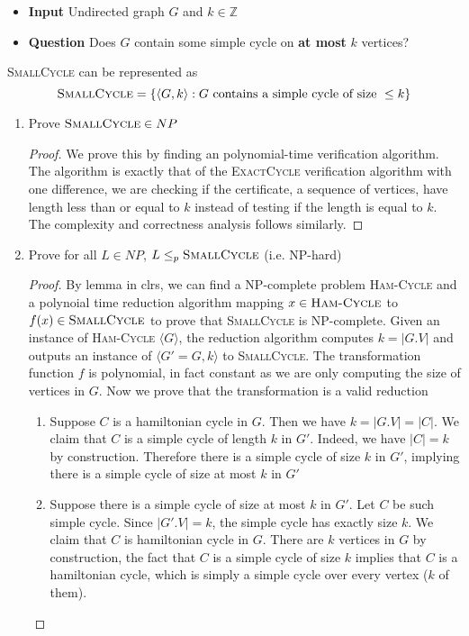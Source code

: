 \documentclass[11pt]{article}
\begin{document}
\begin{enumerate}
    \begin{itemize}
        \item \textbf{Input} Undirected graph $G$ and $k\in \mathbb{Z}$
        \item \textbf{Question} Does $G$ contain some simple cycle on \textbf{at most} $k$ vertices?
    \end{itemize}
    \begin{solution}
        \textsc{SmallCycle} can be represented as 
        \[
            \textsc{SmallCycle} = \{ \langle G, k \rangle: \text{$G$ contains a simple cycle of size  } \leq k \}
        \]
        \begin{enumerate}
            \item Prove $\textsc{SmallCycle} \in NP$
            \begin{proof}
                We prove this by finding an polynomial-time verification algorithm. The algorithm is exactly that of the \textsc{ExactCycle} verification algorithm with one difference, we are checking if the certificate, a sequence of vertices, have length less than or equal to $k$ instead of testing if the length is equal to $k$. The complexity and correctness analysis follows similarly. 
            \end{proof}
            \item Prove for all $L\in NP$, $L\leq_p \textsc{SmallCycle}$  (i.e. NP-hard)
            \begin{proof}
               By lemma in clrs, we can find a NP-complete problem \textsc{Ham-Cycle} and a polynoial time reduction algorithm mapping $x\in \textsc{Ham-Cycle}$ to $f(x)\in \textsc{SmallCycle}$ to prove that \textsc{SmallCycle} is NP-complete. Given an instance of \textsc{Ham-Cycle} $\langle G \rangle$, the reduction algorithm computes $k = |G.V|$ and outputs an instance of $\langle G' = G, k \rangle$ to \textsc{SmallCycle}. The transformation function $f$ is polynomial, in fact constant as we are only computing the size of vertices in $G$. Now we prove that the transformation is a valid reduction 
               \begin{enumerate}
                    \item Suppose $C$ is a hamiltonian cycle in $G$. Then we have $k = |G.V| = |C|$. We claim that $C$ is a simple cycle of length $k$ in $G'$. Indeed, we have $|C| = k$ by construction. Therefore there is a simple cycle of size $k$ in $G'$, implying there is a simple cycle of size at most $k$ in $G'$ 
                    \item Suppose there is a simple cycle of size at most $k$ in $G'$. Let $C$ be such simple cycle. Since $|G'.V| = k$, the simple cycle has exactly size $k$. We claim that $C$ is hamiltonian cycle in $G$. There are $k$ vertices in $G$ by construction, the fact that $C$ is a simple cycle of size $k$ implies that $C$ is a hamiltonian cycle, which is simply a simple cycle over every vertex ($k$ of them).
                \end{enumerate}
            \end{proof}
        \end{enumerate}
    \end{solution}
    

\end{enumerate}
\end{document}
